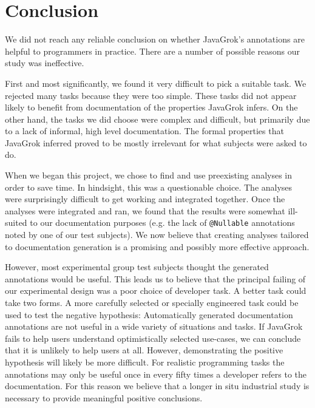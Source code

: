 \section{Conclusion}

We did not reach any reliable conclusion on whether JavaGrok's annotations are
helpful to programmers in practice. There are a number of possible reasons our
study was ineffective.

First and most significantly, we found it very difficult to pick a suitable
task.  We rejected many tasks because they were too simple.  These tasks did not
appear likely to benefit from documentation of the properties JavaGrok infers.
On the other hand, the tasks we did choose were complex and difficult, but primarily due
to a lack of informal, high level documentation.  The formal properties that
JavaGrok inferred proved to be mostly irrelevant for what subjects were asked to
do.

When we began this project, we chose to find and use preexisting analyses in
order to save time.  In hindsight, this was a questionable choice.  The analyses
were surprisingly difficult to get working and integrated together.  Once the
analyses were integrated and ran, we found that the results were somewhat
ill-suited to our documentation purposes (e.g. the lack of \texttt{@Nullable}
annotations noted by one of our test subjects). We now believe that creating
analyses tailored to documentation generation is a promising and possibly more effective
approach.

However, most experimental group test subjects thought the generated annotations would be
useful.  This leads us to believe that the principal failing of our experimental
design was a poor choice of developer task.  A better task could take two forms.  A more carefully
selected or specially engineered task could be used to test the negative
hypothesis:  Automatically generated documentation annotations are not useful in
a wide variety of situations and tasks.  If JavaGrok fails to help users
understand optimistically selected use-cases, we can conclude that it is
unlikely to help users at all.  However, demonstrating the positive hypothesis
will likely be more difficult.  For realistic programming tasks the annotations
may only be useful once in every fifty times a developer refers to the
documentation.  For this reason we believe that a longer in situ
industrial study is necessary to provide meaningful positive conclusions.

